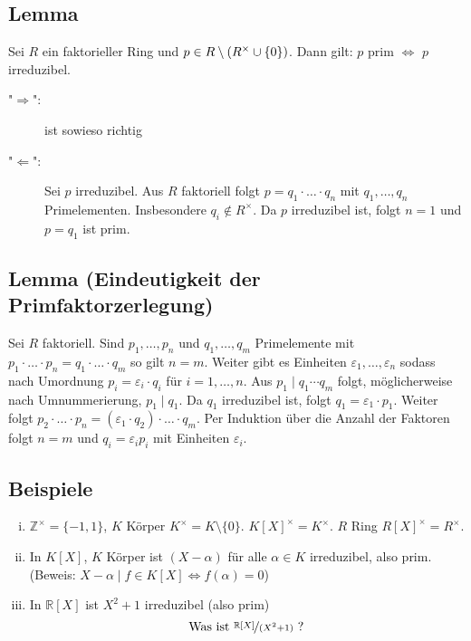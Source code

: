 \subsection[Lemma: In faktoriellen Ringen ist prim äquivalent zu irreduzibel]{Lemma} %
\label{sub:710}
Sei $R$ ein faktorieller Ring und $p \in R\setminus \enbrace*{R^\times \cup \{0\}} $. Dann gilt: $p$ prim $\iff$ $p$ irreduzibel.
\begin{description}
	\item["$\Rightarrow $":] ist sowieso richtig
	\item["$\Leftarrow$":] Sei $p$ irreduzibel. Aus $R$ faktoriell folgt $p = q_1 \cdot \ldots \cdot q_n$ mit $q_1, \ldots , q_n$ Primelementen. Insbesondere 
	$q_i \not\in R^\times$. Da $p$ irreduzibel ist, folgt $n=1$ und $p= q_1$ ist prim. \bewende
\end{description}

\subsection{Lemma (Eindeutigkeit der Primfaktorzerlegung)} %
\label{sub:711}
Sei $R$ faktoriell. Sind $p_1, \ldots , p_n$ und $q_1, \ldots , q_m$ Primelemente mit $p_1 \cdot \ldots \cdot p_n = q_1 \cdot \ldots \cdot q_m$ so gilt $n=m$. Weiter gibt es Einheiten $\varepsilon_1, \ldots ,\varepsilon_n$ sodass nach Umordnung $p_i = \varepsilon_i \cdot q_i$ für $i=1,\ldots ,n$.
Aus $p_1 \mid q_1 \cdots q_m$ folgt, möglicherweise nach Umnummerierung, $p_1 \mid q_1$. Da $q_1$ irreduzibel ist, folgt $q_1 = \varepsilon_1 \cdot p_1$. Weiter folgt
$p_2 \cdot \ldots \cdot p_n = (\varepsilon_1 \cdot q_2) \cdot \ldots \cdot q_m$. Per Induktion über die Anzahl der Faktoren folgt $n= m$ und $q_i =  \varepsilon_i p_i$
mit Einheiten $\varepsilon_i$. \bewende

\subsection[Beispiele: Einheitengruppen, irreduzible Elemente]{Beispiele} %
\label{sub:712}
\begin{enumerate}[(i)]
	\item $\mathds{Z}^\times = \{-1,1\}$, $K$ Körper $K^\times = K \setminus \{0\}$.
	$K[X]^\times = K^\times$. $R$ Ring $R[X]^\times = R^\times$.
	\item In $K[X]$, $K$ Körper ist $(X- \alpha)$ für alle $\alpha \in K$ irreduzibel, also prim. \\
	(Beweis: $X- \alpha \mid f \in K[X] \iff f(\alpha)=0$)
	\item In $\mathds{R}[X]$ ist $X^2+1$ irreduzibel (also prim)
	\[
		\text{Was ist }\nicefrac{\mathds{R}[X]}{(X^2+1)} \text{ ?}
	\]
\end{enumerate}

